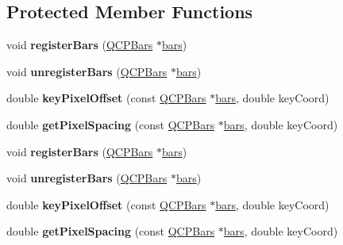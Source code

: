 \subsection*{Protected Member Functions}
\begin{DoxyCompactItemize}
\item 
\mbox{\label{class_q_c_p_bars_group_a7b00514f19ad58d0bb3fd5246a67fae2}} 
void {\bfseries register\+Bars} (\hyperlink{class_q_c_p_bars}{Q\+C\+P\+Bars} $\ast$\hyperlink{class_q_c_p_bars_group_a6e4f4e86abbec6a9342f204ef82abef8}{bars})
\item 
\mbox{\label{class_q_c_p_bars_group_ac7073cdd7b1a40c6cb4b5f908145f8c4}} 
void {\bfseries unregister\+Bars} (\hyperlink{class_q_c_p_bars}{Q\+C\+P\+Bars} $\ast$\hyperlink{class_q_c_p_bars_group_a6e4f4e86abbec6a9342f204ef82abef8}{bars})
\item 
\mbox{\label{class_q_c_p_bars_group_a8e2ca6002e7bab49670144d048a2bcc9}} 
double {\bfseries key\+Pixel\+Offset} (const \hyperlink{class_q_c_p_bars}{Q\+C\+P\+Bars} $\ast$\hyperlink{class_q_c_p_bars_group_a6e4f4e86abbec6a9342f204ef82abef8}{bars}, double key\+Coord)
\item 
\mbox{\label{class_q_c_p_bars_group_a0beccd41bc3841a4c5b284823bc7d2de}} 
double {\bfseries get\+Pixel\+Spacing} (const \hyperlink{class_q_c_p_bars}{Q\+C\+P\+Bars} $\ast$\hyperlink{class_q_c_p_bars_group_a6e4f4e86abbec6a9342f204ef82abef8}{bars}, double key\+Coord)
\item 
\mbox{\label{class_q_c_p_bars_group_a7b00514f19ad58d0bb3fd5246a67fae2}} 
void {\bfseries register\+Bars} (\hyperlink{class_q_c_p_bars}{Q\+C\+P\+Bars} $\ast$\hyperlink{class_q_c_p_bars_group_a6e4f4e86abbec6a9342f204ef82abef8}{bars})
\item 
\mbox{\label{class_q_c_p_bars_group_ac7073cdd7b1a40c6cb4b5f908145f8c4}} 
void {\bfseries unregister\+Bars} (\hyperlink{class_q_c_p_bars}{Q\+C\+P\+Bars} $\ast$\hyperlink{class_q_c_p_bars_group_a6e4f4e86abbec6a9342f204ef82abef8}{bars})
\item 
\mbox{\label{class_q_c_p_bars_group_a8e2ca6002e7bab49670144d048a2bcc9}} 
double {\bfseries key\+Pixel\+Offset} (const \hyperlink{class_q_c_p_bars}{Q\+C\+P\+Bars} $\ast$\hyperlink{class_q_c_p_bars_group_a6e4f4e86abbec6a9342f204ef82abef8}{bars}, double key\+Coord)
\item 
\mbox{\label{class_q_c_p_bars_group_a0beccd41bc3841a4c5b284823bc7d2de}} 
double {\bfseries get\+Pixel\+Spacing} (const \hyperlink{class_q_c_p_bars}{Q\+C\+P\+Bars} $\ast$\hyperlink{class_q_c_p_bars_group_a6e4f4e86abbec6a9342f204ef82abef8}{bars}, double key\+Coord)
\end{DoxyCompactItemize}
